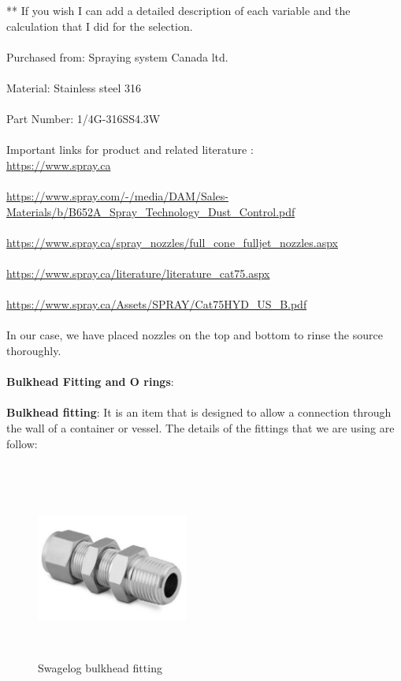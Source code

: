 ** If you wish I can add a detailed description of each variable and the calculation that I did for the selection.\\
\\
Purchased from: Spraying system Canada ltd.\\
\\
Material: Stainless steel 316\\
\\
Part Number: 1/4G-316SS4.3W \\
\\
Important links for product and related literature :
\\
\url{https://www.spray.ca}\\
\\
\url{https://www.spray.com/-/media/DAM/Sales-Materials/b/B652A_Spray_Technology_Dust_Control.pdf}\\
\\
\url{https://www.spray.ca/spray_nozzles/full_cone_fulljet_nozzles.aspx}\\
\\
\url{https://www.spray.ca/literature/literature_cat75.aspx}\\
\\
\url{https://www.spray.ca/Assets/SPRAY/Cat75HYD_US_B.pdf}\\
\\
In our case, we have placed nozzles on the top and bottom to rinse the source thoroughly.\\
\\
\textbf{Bulkhead Fitting and O rings}: \\
\\
\textbf{Bulkhead fitting}:
It is an item that is designed to allow a connection through the wall of a container or vessel. The details of the fittings that we are using are follow:\\
\\
\begin{figure}[!htpb]
  \centering
  \includegraphics[width = 5cm, height=6cm ]{figures/ftng}
  \caption{Swagelog bulkhead fitting}
  \label{fig:ftng}
\end{figure}
